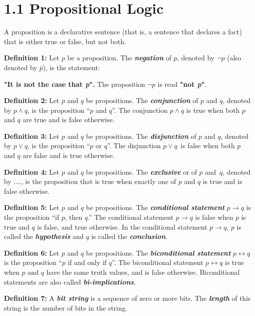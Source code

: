 \documentclass[12pt,letterpaper]{article}
\begin{document}
\section*{1.1 Propositional Logic}

A proposition is a declarative sentence (that is, a sentence that declares a fact) that is either true or false, but not both.

\textbf{Definition 1:} Let $p$ be a proposition. The \textbf{\textit{negation}} of $p$, denoted by $\neg p$ (also denoted by $\bar{p}$), is the statement:

\textbf{"It is not the case that \textit{p}".} The proposition $\neg p$ is read \textbf{"not \textit{p}"}.

\textbf{Definition 2:} Let $p$ and $q$ be propositions. The \textbf{\textit{conjunction}} of $p$ and $q$, denoted by  $p \wedge q$, is the proposition ``$p$ and $q$''. The conjunction $p \wedge q$ is true when both $p$ and $q$ are true and is false otherwise.

\textbf{Definition 3:} Let $p$ and $q$ be propositions. The \textbf{\textit{disjunction}} of $p$ and $q$, denoted by $p \vee q$, is the proposition ``$p$ or $q$''. The disjunction $p \vee q$ is false when both $p$ and $q$ are false and is true otherwise.

\textbf{Definition 4:} Let $p$ and $q$ be propositions. The \textbf{\textit{exclusive}} or of $p$ and $q$, denoted by ...., is the proposition that is true when exactly one of $p$ and $q$ is true and is false otherwise.

\textbf{Definition 5:} Let $p$ and $q$ be propositions. The \textbf{\textit{conditional statement}} $p \rightarrow q$ is the proposition ``if $p$, then $q$.'' The conditional statement $p \rightarrow q$ is false when $p$ is true and $q$ is false, and true otherwise. In the conditional statement $p \rightarrow q$, $p$ is called the \textbf{\textit{hypothesis}} and $q$ is called the \textbf{\textit{conclusion}}.

\textbf{Definition 6:} Let $p$ and $q$ be propositions. The \textbf{\textit{biconditional statement}} $p \leftrightarrow q$ is the proposition ``$p$ if and only if $q$''. The biconditional statement $p \leftrightarrow q$ is true when $p$ and $q$ have the same truth values, and is false otherwise. Biconditional statements are also called \textbf{\textit{bi-implications}}.

\textbf{Definition 7:} A \textbf{\textit{bit string}} is a sequence of zero or more bits. The \textbf{\textit{length}} of this string is the number of bits in the string.
\end{document}
